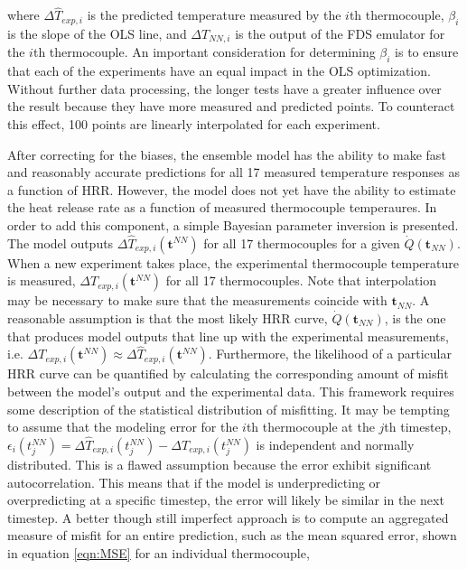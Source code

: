 \documentclass{article}
\begin{document}
where $\Delta \hat{T}_{exp, i}$ is the predicted temperature measured by the $i$th thermocouple, $\beta_i$ is the slope of the OLS line, and $\Delta T _{NN, i}$ is the output of the FDS emulator for the $i$th thermocouple. An important consideration for determining $\beta_i$ is to ensure that each of the experiments have an equal impact in the OLS optimization. Without further data processing, the longer tests have a greater influence over the result because they have more measured and predicted points. To counteract this effect, 100 points are linearly interpolated for each experiment.  

After correcting for the biases, the ensemble model has the ability to make  fast and reasonably accurate predictions for all 17 measured temperature responses as a function of HRR. However, the model does not yet have the ability to estimate the heat release rate as a function of measured thermocouple temperaures. In order to add this component, a simple Bayesian parameter inversion is presented. The model outputs $\Delta \hat{T}_{exp, i}(\boldsymbol{t}^{NN})$ for all 17 thermocouples for a given $\dot{Q}(\boldsymbol{t}_{NN})$. When a new experiment takes place,  the experimental thermocouple temperature is measured, $\Delta T_{exp, i}(\boldsymbol{t}^{NN})$ for all 17 thermocouples. Note that interpolation may be necessary to make sure that the measurements coincide with $\boldsymbol{t}_{NN}$. A reasonable assumption is that the most likely HRR curve, $\dot{Q}(\boldsymbol{t}_{NN})$, is the one that produces model outputs that line up with the experimental measurements, i.e. $\Delta T_{exp, i}(\boldsymbol{t}^{NN}) \approx \Delta \hat{T}_{exp, i}(\boldsymbol{t}^{NN})$. Furthermore, the likelihood of a particular HRR curve can be quantified by calculating the corresponding amount of misfit between the model's output and the experimental data. This framework requires some description of the statistical distribution of misfitting. It may be tempting to assume that the modeling error for the $i$th thermocouple at the $j$th timestep,   $\epsilon_i(t^{NN}_j) = \Delta \hat{T}_{exp, i}(t^{NN}_j) - \Delta T_{exp, i}(t^{NN}_j)$ is independent and normally distributed. This is a flawed assumption because the error exhibit significant autocorrelation. This means that if the model is underpredicting or overpredicting at a specific timestep, the error will likely be similar in the next timestep. A better though still imperfect approach is to compute an aggregated measure of misfit for an entire prediction, such as the mean squared error, shown in equation \ref{eqn:MSE} for an individual thermocouple,
\end{document}
